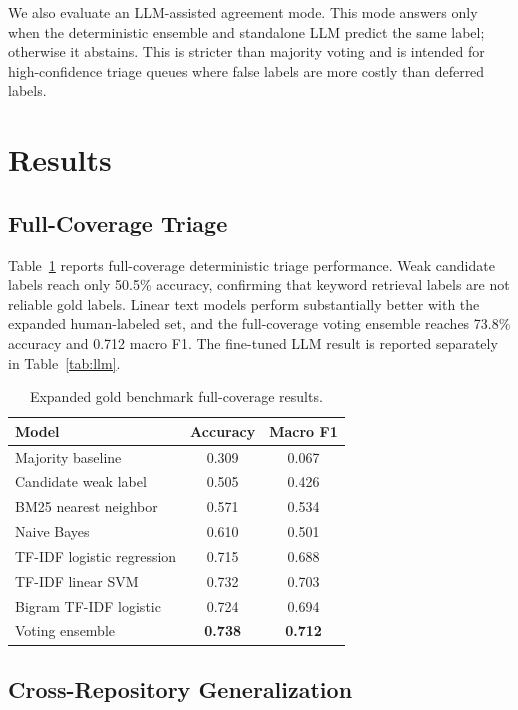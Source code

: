 \documentclass[conference]{IEEEtran}
\begin{document}
We also evaluate an LLM-assisted agreement mode. This mode answers only when
the deterministic ensemble and standalone LLM predict the same label; otherwise
it abstains. This is stricter than majority voting and is intended for
high-confidence triage queues where false labels are more costly than deferred
labels.

\section{Results}

\subsection{Full-Coverage Triage}

Table~\ref{tab:fullcoverage} reports full-coverage deterministic triage
performance. Weak candidate labels reach only 50.5\% accuracy, confirming that
keyword retrieval labels are not reliable gold labels. Linear text models
perform substantially better with the expanded human-labeled set, and the
full-coverage voting ensemble reaches 73.8\% accuracy and 0.712 macro F1. The
fine-tuned LLM result is reported separately in Table~\ref{tab:llm}.

\begin{table}[t]
\centering
\caption{Expanded gold benchmark full-coverage results.}
\label{tab:fullcoverage}
\begin{tabular}{lcc}
\toprule
Model & Accuracy & Macro F1 \\
\midrule
Majority baseline & 0.309 & 0.067 \\
Candidate weak label & 0.505 & 0.426 \\
BM25 nearest neighbor & 0.571 & 0.534 \\
Naive Bayes & 0.610 & 0.501 \\
TF-IDF logistic regression & 0.715 & 0.688 \\
TF-IDF linear SVM & 0.732 & 0.703 \\
Bigram TF-IDF logistic & 0.724 & 0.694 \\
Voting ensemble & \textbf{0.738} & \textbf{0.712} \\
\bottomrule
\end{tabular}
\end{table}

\subsection{Cross-Repository Generalization}
\end{document}
